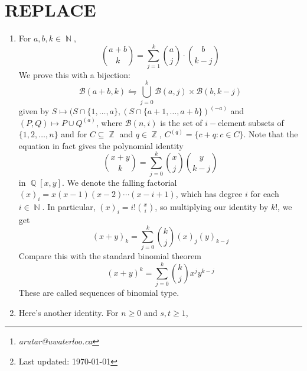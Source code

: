 \documentclass[11pt, a4paper]{memoir}
\title{\subject}
\author{Alex Rutar\thanks{\itshape arutar@uwaterloo.ca}\\ University of Waterloo}
\date{\semester\thanks{Last updated: \today}}
\DeclareMathOperator{\N}{{\mathbb{N}}}
\DeclareMathOperator{\Q}{{\mathbb{Q}}}
\DeclareMathOperator{\Z}{{\mathbb{Z}}}
\theoremstyle{change}
\theoremstyle{plain}
\theoremstyle{nonumberplain}
\numberwithin{equation}{section}
\begin{document}
\hypersetup{pageanchor=false}
\maketitle
\newpage
\frontmatter
\hypersetup{pageanchor=true}
\tableofcontents*
\newpage
\mainmatter


\chapter{REPLACE}
\begin{enumerate}
    \item For $a,b,k\in\N$,
        \begin{equation}\label{e:van}
            \binom{a+b}{k} = \sum_{j=1}^k\binom{a}{j}\cdot\binom{b}{k-j}
        \end{equation}
        We prove this with a bijection:
        \begin{equation*}
            \mathcal{B}(a+b,k) \leftrightharpoons \bigcup_{j=0}^k\mathcal{B}(a,j)\times\mathcal{B}(b,k-j)
        \end{equation*}
        given by $S\mapsto (S\cap\{1,\ldots,a\},(S\cap\{a+1,\ldots,a+b\})^{(-a)}$ and $(P,Q)\mapsto P\cup Q^{(a)}$, where $\mathcal{B}(n,i)$ is the set of $i-$element subsets of $\{1,2,\ldots,n\}$ and for $C\subseteq\Z$ and $q\in\Z$, $C^{(q)}=\{c+q:c\in C\}$.
        Note that the equation in fact gives the polynomial identity
        \begin{equation*}
            \binom{x+y}{k}=\sum_{j=0}^k\binom{x}{j}\binom{y}{k-j}
        \end{equation*}
        in $\Q[x,y]$.
        We denote the falling factorial $(x)_i=x(x-1)(x-2)\cdots(x-i+1)$, which has degree $i$ for each $i\in\N$.
        In particular, $(x)_i=i!\binom{x}{i}$, so multiplying our identity by $k!$, we get
        \begin{equation*}
            (x+y)_k=\sum_{j=0}^k\binom{k}{j}(x)_j(y)_{k-j}
        \end{equation*}
        Compare this with the standard binomial theorem
        \begin{equation*}
            (x+y)^k=\sum_{j=0}^k\binom{k}{j}x^jy^{k-j}
        \end{equation*}
        These are called sequences of binomial type.
    \item Here's another identity.
        For $n\geq 0$ and $s,t\geq 1$,
        \begin{equation*}

\end{equation*}
\end{enumerate}
\end{document}
